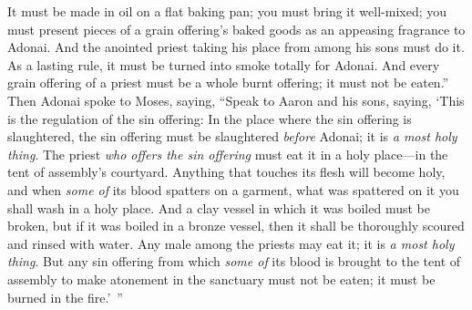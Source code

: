 \begin{biblechapter}
\verse It must be made in oil on a flat baking pan; you must bring it well-mixed; you must present pieces of a grain offering’s baked goods as an appeasing fragrance to Adonai.
\verse And the anointed priest taking his place from among his sons must do it. As a lasting rule, it must be turned into smoke totally for Adonai.
\verse And every grain offering of a priest must be a whole burnt offering; it must not be eaten.”
 Then Adonai spoke to Moses, saying,
\verse “Speak to Aaron and his sons, saying, ‘This is the regulation of the sin offering: In the place where the sin offering is slaughtered, the sin offering must be slaughtered \textit{before} Adonai; it is \textit{a most holy thing}.
\verse The priest \textit{who offers the sin offering} must eat it in a holy place—in the tent of assembly’s courtyard.
\verse Anything that touches its flesh will become holy, and when \textit{some of} its blood spatters on a garment, what was spattered on it you shall wash in a holy place.
\verse And a clay vessel in which it was boiled must be broken, but if it was boiled in a bronze vessel, then it shall be thoroughly scoured and rinsed with water.
\verse Any male among the priests may eat it; it is \textit{a most holy thing}.
\verse But any sin offering from which \textit{some of} its blood is brought to the tent of assembly to make atonement in the sanctuary must not be eaten; it must be burned in the fire.’ ”
\end{biblechapter}


